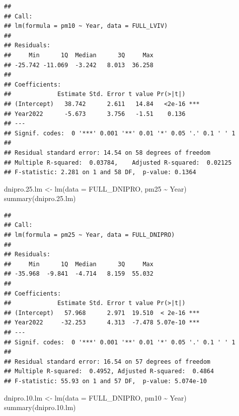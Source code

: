 \documentclass[
  12pt,
]{article}
\newenvironment{Shaded}{\begin{snugshade}}{\end{snugshade}}
\newcommand{\AttributeTok}[1]{\textcolor[rgb]{0.77,0.63,0.00}{#1}}
\newcommand{\FloatTok}[1]{\textcolor[rgb]{0.00,0.00,0.81}{#1}}
\newcommand{\FunctionTok}[1]{\textcolor[rgb]{0.00,0.00,0.00}{#1}}
\newcommand{\NormalTok}[1]{#1}
\newcommand{\OtherTok}[1]{\textcolor[rgb]{0.56,0.35,0.01}{#1}}
\newcommand{\SpecialCharTok}[1]{\textcolor[rgb]{0.00,0.00,0.00}{#1}}
\begin{document}
\begin{verbatim}
## 
## Call:
## lm(formula = pm10 ~ Year, data = FULL_LVIV)
## 
## Residuals:
##     Min      1Q  Median      3Q     Max 
## -25.742 -11.069  -3.242   8.013  36.258 
## 
## Coefficients:
##             Estimate Std. Error t value Pr(>|t|)    
## (Intercept)   38.742      2.611   14.84   <2e-16 ***
## Year2022      -5.673      3.756   -1.51    0.136    
## ---
## Signif. codes:  0 '***' 0.001 '**' 0.01 '*' 0.05 '.' 0.1 ' ' 1
## 
## Residual standard error: 14.54 on 58 degrees of freedom
## Multiple R-squared:  0.03784,    Adjusted R-squared:  0.02125 
## F-statistic: 2.281 on 1 and 58 DF,  p-value: 0.1364
\end{verbatim}

\begin{Shaded}
\begin{Highlighting}[]
\NormalTok{dnipro.}\FloatTok{25.}\NormalTok{lm }\OtherTok{\textless{}{-}} \FunctionTok{lm}\NormalTok{(}\AttributeTok{data =}\NormalTok{ FULL\_DNIPRO, pm25 }\SpecialCharTok{\textasciitilde{}}\NormalTok{ Year) }
\FunctionTok{summary}\NormalTok{(dnipro.}\FloatTok{25.}\NormalTok{lm) }
\end{Highlighting}
\end{Shaded}

\begin{verbatim}
## 
## Call:
## lm(formula = pm25 ~ Year, data = FULL_DNIPRO)
## 
## Residuals:
##     Min      1Q  Median      3Q     Max 
## -35.968  -9.841  -4.714   8.159  55.032 
## 
## Coefficients:
##             Estimate Std. Error t value Pr(>|t|)    
## (Intercept)   57.968      2.971  19.510  < 2e-16 ***
## Year2022     -32.253      4.313  -7.478 5.07e-10 ***
## ---
## Signif. codes:  0 '***' 0.001 '**' 0.01 '*' 0.05 '.' 0.1 ' ' 1
## 
## Residual standard error: 16.54 on 57 degrees of freedom
## Multiple R-squared:  0.4952, Adjusted R-squared:  0.4864 
## F-statistic: 55.93 on 1 and 57 DF,  p-value: 5.074e-10
\end{verbatim}

\begin{Shaded}
\begin{Highlighting}[]
\NormalTok{dnipro.}\FloatTok{10.}\NormalTok{lm }\OtherTok{\textless{}{-}} \FunctionTok{lm}\NormalTok{(}\AttributeTok{data =}\NormalTok{ FULL\_DNIPRO, pm10 }\SpecialCharTok{\textasciitilde{}}\NormalTok{ Year) }
\FunctionTok{summary}\NormalTok{(dnipro.}\FloatTok{10.}\NormalTok{lm) }
\end{Highlighting}
\end{Shaded}
\end{document}
